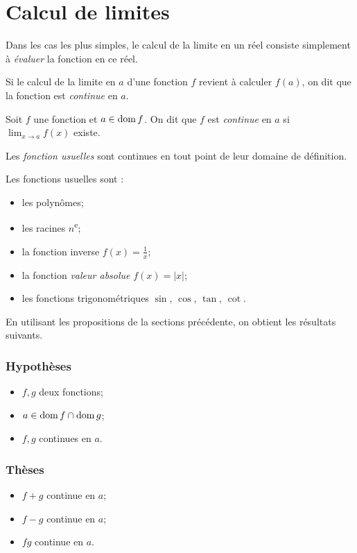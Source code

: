 \documentclass[main.tex]{subfiles}
\begin{document}
\section{Calcul de limites}

Dans les cas les plus simples,
le calcul de la limite en un réel consiste simplement à \emph{évaluer} la fonction en ce réel.

Si le calcul de la limite en $a$ d'une fonction $f$ revient à calculer $f(a)$, on dit que la fonction est \emph{continue} en $a$.

\begin{definition}

    Soit $f$ une fonction et $a \in \operatorname{dom} f$.
    On dit que $f$ est \emph{continue} en $a$
    si $\lim_{x \to a} f(x)$ existe.
\end{definition}

Les \emph{fonction usuelles} sont continues en tout point de leur domaine de définition.

\begin{howto}

    Les fonctions usuelles sont :
    \begin{itemize}
        \item les polynômes;
        \item les racines $n$\textsuperscript e;
        \item la fonction inverse $f(x) = \frac 1 x$;
        \item la fonction \emph{valeur absolue} $f(x) = |x|$;
        \item les fonctions trigonométriques $\sin$, $\cos$, $\tan$, $\cot$.
    \end{itemize}
\end{howto}

En utilisant les propositions de la sections précédente, on obtient les résultats suivants.

\begin{proposition}

    \subsubsection*{Hypothèses}
    \begin{itemize}
        \item $f, g$ deux fonctions;
        \item $a \in \operatorname{dom} f \cap \operatorname{dom} g$;
        \item $f ,g$ continues en $a$.
    \end{itemize}

    \subsubsection*{Thèses}
    \begin{itemize}
        \item $f+g$ continue en $a$;
        \item $f-g$ continue en $a$;
        \item $fg$ continue en $a$.
    \end{itemize}
\end{proposition}
\end{document}
